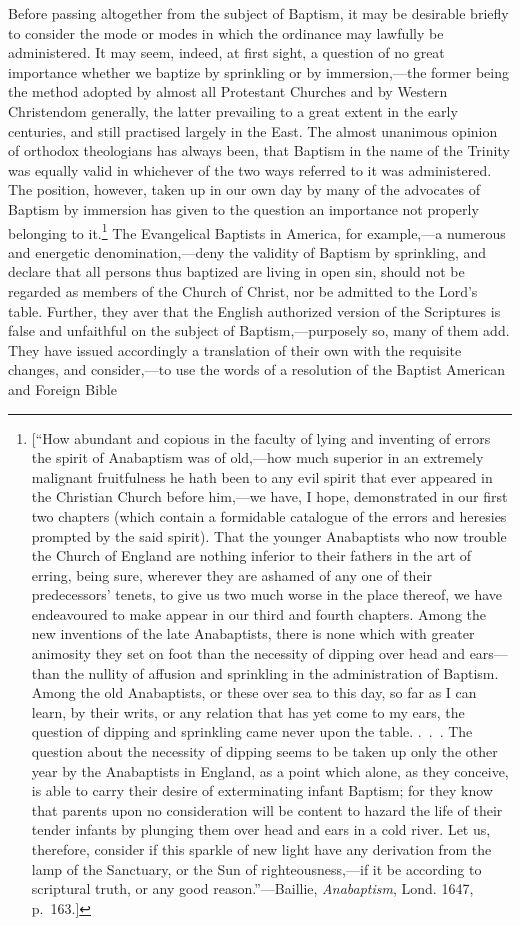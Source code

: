 \documentclass[
  english,
]{book}
\begin{document}
Before passing altogether from the subject of Baptism, it may be desirable briefly to consider the mode or modes in which the ordinance may lawfully be administered. It may seem, indeed, at first sight, a question of no great importance whether we baptize by sprinkling or by immersion,---the former being the method adopted by almost all Protestant Churches and by Western Christendom generally, the latter prevailing to a great extent in the early centuries, and still practised largely in the East. The almost unanimous opinion of orthodox theologians has always been, that Baptism in the name of the Trinity was equally valid in whichever of the two ways referred to it was administered. The position, however, taken up in our own day by many of the advocates of Baptism by immersion has given to the question an importance not properly belonging to it.\footnote{{[}``How abundant and copious in the faculty of lying and inventing of errors the spirit of Anabaptism was of old,---how much superior in an extremely malignant fruitfulness he hath been to any evil spirit that ever appeared in the Christian Church before him,---we have, I hope, demonstrated in our first two chapters (which contain a formidable catalogue of the errors and heresies prompted by the said spirit). That the younger Anabaptists who now trouble the Church of England are nothing inferior to their fathers in the art of erring, being sure, wherever they are ashamed of any one of their predecessors' tenets, to give us two much worse in the place thereof, we have endeavoured to make appear in our third and fourth chapters. Among the new inventions of the late Anabaptists, there is none which with greater animosity they set on foot than the necessity of dipping over head and ears---than the nullity of affusion and sprinkling in the administration of Baptism. Among the old Anabaptists, or these over sea to this day, so far as I can learn, by their writs, or any relation that has yet come to my ears, the question of dipping and sprinkling came never upon the table. .~.~. The question about the necessity of dipping seems to be taken up only the other year by the Anabaptists in England, as a point which alone, as they conceive, is able to carry their desire of exterminating infant Baptism; for they know that parents upon no consideration will be content to hazard the life of their tender infants by plunging them over head and ears in a cold river. Let us, therefore, consider if this sparkle of new light have any derivation from the lamp of the Sanctuary, or the Sun of righteousness,---if it be according to scriptural truth, or any good reason.''---Baillie, \emph{Anabaptism}, Lond. 1647, p.~163.{]}} The Evangelical Baptists in America, for example,---a numerous and energetic denomination,---deny the validity of Baptism by sprinkling, and declare that all persons thus baptized are living in open sin, should not be regarded as members of the Church of Christ, nor be admitted to the Lord's table. Further, they aver that the English authorized version of the Scriptures is false and unfaithful on the subject of Baptism,---purposely so, many of them add. They have issued accordingly a translation of their own with the requisite changes, and consider,---to use the words of a resolution of the Baptist American and Foreign Bible 
\end{document}
